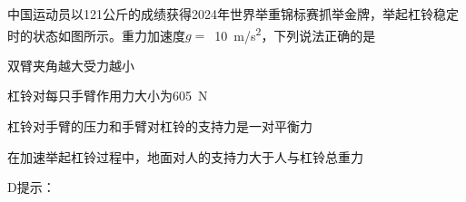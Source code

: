 中国运动员以121公斤的成绩获得2024年世界举重锦标赛抓举金牌，举起杠铃稳定时的状态如图所示。重力加速度\(g =\) \,\qty{10}{m/s^2}，下列说法正确的是\paren[]
\begin{choices}
	\item 双臂夹角越大受力越小
	\item 杠铃对每只手臂作用力大小为\qty{605}{N}
	\item 杠铃对手臂的压力和手臂对杠铃的支持力是一对平衡力
	\item 在加速举起杠铃过程中，地面对人的支持力大于人与杠铃总重力
\end{choices}
\begin{answer}
	D\qquad 提示：
\end{answer}